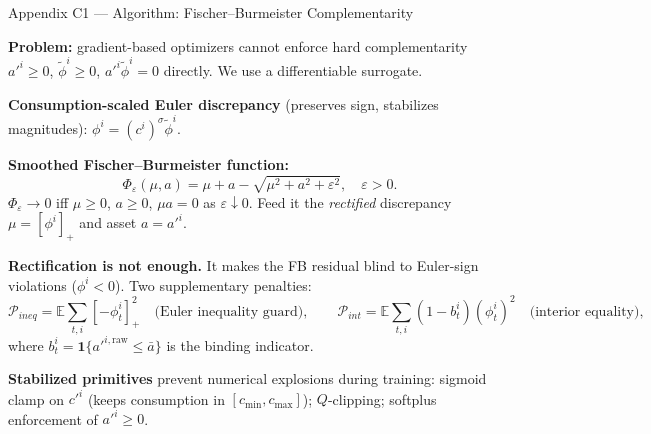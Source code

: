\documentclass[10pt,aspectratio=169]{beamer}
\begin{document}
\begin{frame}[label=appFB]{Appendix C1 --- Algorithm: Fischer--Burmeister Complementarity}
\hfill\hyperlink{mainFinalAlgo}{}
\vspace{0.2em}

\textbf{Problem:} gradient-based optimizers cannot enforce hard complementarity $a'^i\ge0$,
$\tilde\phi^i\ge0$, $a'^i\tilde\phi^i=0$ directly. We use a differentiable surrogate.

\smallskip
\textbf{Consumption-scaled Euler discrepancy} (preserves sign, stabilizes magnitudes):
$\phi^i=(c^i)^\sigma\tilde\phi^i$.

\smallskip
\textbf{Smoothed Fischer--Burmeister function:}
\[
\Phi_\varepsilon(\mu,a)=\mu+a-\sqrt{\mu^2+a^2+\varepsilon^2},\quad\varepsilon>0.
\]
$\Phi_\varepsilon\to0$ iff $\mu\ge0$, $a\ge0$, $\mu a=0$ as $\varepsilon\downarrow0$. Feed it the
\emph{rectified} discrepancy $\mu=[\phi^i]_+$ and asset $a=a'^i$.

\smallskip
\textbf{Rectification is not enough.} It makes the FB residual blind to Euler-sign violations
($\phi^i<0$). Two supplementary penalties:
\[
\mathcal{P}_{ineq}=\mathbb{E}\textstyle\sum_{t,i}[-\phi^i_t]_+^2\quad\text{(Euler inequality guard)},
\qquad
\mathcal{P}_{int}=\mathbb{E}\textstyle\sum_{t,i}(1-b^i_t)(\phi^i_t)^2\quad\text{(interior equality)},
\]
where $b^i_t=\mathbf{1}\{a'^{i,\text{raw}}\le\bar a\}$ is the binding indicator.

\smallskip
\textbf{Stabilized primitives} prevent numerical explosions during training:
sigmoid clamp on $c'^i$ (keeps consumption in $[c_{\min},c_{\max}]$);
$Q$-clipping; softplus enforcement of $a'^i\ge0$.
\end{frame}
\end{document}
